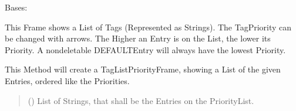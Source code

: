 \documentclass[letterpaper,10pt,english]{sphinxmanual}
\begin{document}
\begin{fulllineitems}
\label{\detokenize{apidoc/src.osm_configurator.view.utilityframes:src.osm_configurator.view.utilityframes.tag_list_priority_frame.TagListPriorityFrame}}
\pysigstartsignatures
{}
\pysigstopsignatures
\sphinxAtStartPar
Bases: 

\sphinxAtStartPar
This Frame shows a List of Tags (Represented as Strings). The Tag\sphinxhyphen{}Priority can be changed with arrows.
The Higher an Entry is on the List, the lower its Priority.
A non\sphinxhyphen{}deletable DEFAULT\sphinxhyphen{}Entry will always have the lowest Priority.

\begin{fulllineitems}
\label{\detokenize{apidoc/src.osm_configurator.view.utilityframes:src.osm_configurator.view.utilityframes.tag_list_priority_frame.TagListPriorityFrame.__init__}}
\pysigstartsignatures
{}
\pysigstopsignatures
\sphinxAtStartPar
This Method will create a TagListPriorityFrame, showing a List of the given Entries, ordered like the Priorities.
\begin{quote}\begin{description}
\sphinxAtStartPar
{}\sphinxstyleliteralstrong{\sphinxupquote{{[}}}\sphinxstyleliteralstrong{\sphinxupquote{{]}}} () \textendash{} List of Strings, that shall be the Entries on the PriorityList.

\end{description}\end{quote}

\end{fulllineitems}



\end{fulllineitems}
\end{document}
